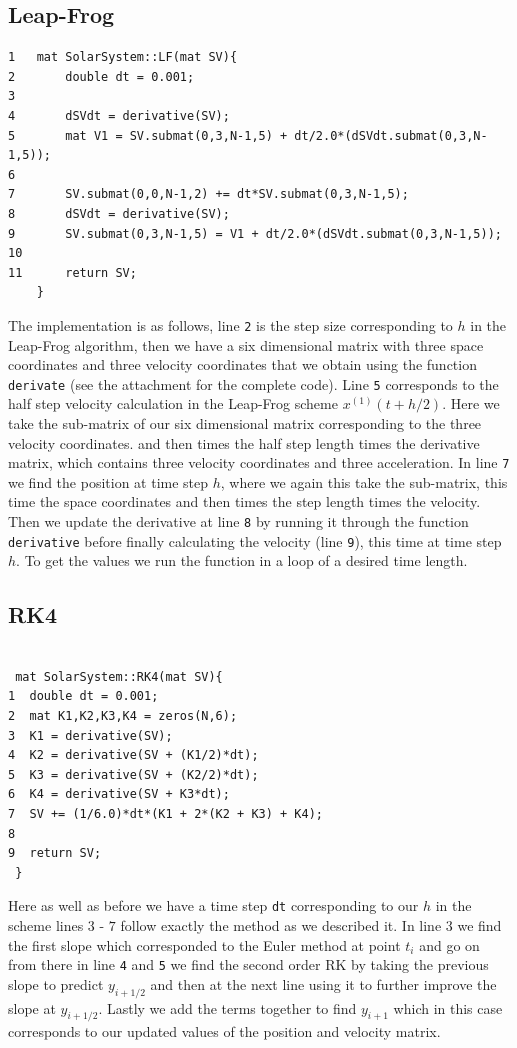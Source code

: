 \documentclass{article}
\begin{document}
\subsection{Leap-Frog}
\begin{verbatim}
1   mat SolarSystem::LF(mat SV){
2       double dt = 0.001;
3    
4       dSVdt = derivative(SV); 
5       mat V1 = SV.submat(0,3,N-1,5) + dt/2.0*(dSVdt.submat(0,3,N-1,5));
6       
7       SV.submat(0,0,N-1,2) += dt*SV.submat(0,3,N-1,5);
8       dSVdt = derivative(SV);
9       SV.submat(0,3,N-1,5) = V1 + dt/2.0*(dSVdt.submat(0,3,N-1,5));
10
11      return SV;
    }
\end{verbatim}
The implementation is as follows, line \texttt{2} is the step size corresponding to $h$ in the Leap-Frog algorithm, then we have a six dimensional matrix with three space coordinates and three velocity coordinates that we obtain using the function \texttt{derivate} (see the attachment for the complete code). Line \texttt{5} corresponds to the half step velocity calculation in the Leap-Frog scheme $x^{(1)}(t+h/2)$. Here we take the sub-matrix of our six dimensional matrix corresponding to the three velocity coordinates. and then times the half step length times the derivative matrix, which contains three velocity coordinates and three acceleration. In line \texttt{7} we find the position at time step $h$, where we again this take the sub-matrix, this time the space coordinates and then times the step length times the velocity. Then we update the derivative at line \texttt{8} by running it through the function \texttt{derivative} before finally calculating the velocity (line \texttt{9}), this time at time step $h$. To get the values we run the function in a loop of a desired time length.
\newpage
\subsection{RK4}

\begin{verbatim}

 mat SolarSystem::RK4(mat SV){
1  double dt = 0.001;
2  mat K1,K2,K3,K4 = zeros(N,6);
3  K1 = derivative(SV);
4  K2 = derivative(SV + (K1/2)*dt);
5  K3 = derivative(SV + (K2/2)*dt);
6  K4 = derivative(SV + K3*dt);
7  SV += (1/6.0)*dt*(K1 + 2*(K2 + K3) + K4);
8  
9  return SV;
 }
\end{verbatim}
Here as well as before we have a time step \texttt{dt} corresponding to our $h$ in the scheme lines $3$ - $7$ follow exactly the method as we described it. In line $3$ we find the first slope which corresponded to the Euler method at point $t_i$ and go on from there in line \texttt{4} and \texttt{5} we find the second order RK by taking the previous slope to predict $y_{i+1/2}$ and then at the next line using it to further improve the slope at $y_{i+1/2}$. Lastly we add the terms together to find $y_{i+1}$ which in this case corresponds to our updated values of the position and velocity matrix. 
\end{document}
